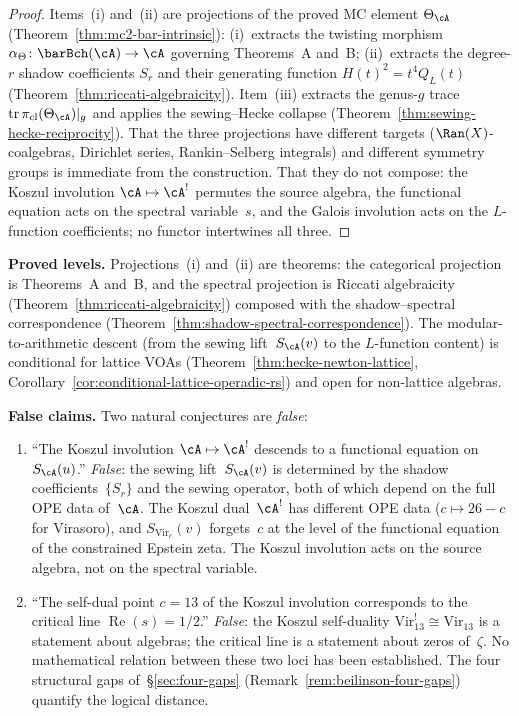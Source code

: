 \begin{proof}
Items~(i) and~(ii) are projections of the proved MC
element $\Theta_\cA$ (Theorem~\ref{thm:mc2-bar-intrinsic}):
(i)~extracts the twisting morphism
$\alpha_\Theta \colon \barBch(\cA) \to \cA$ governing
Theorems~A and~B; (ii)~extracts the degree-$r$ shadow
coefficients $S_r$ and their generating function
$H(t)^2 = t^4 Q_L(t)$
(Theorem~\ref{thm:riccati-algebraicity}).
Item~(iii) extracts the genus-$g$ trace
$\mathrm{tr}\,\pi_{\mathrm{cl}}(\Theta_\cA)|_g$
and applies the sewing--Hecke collapse
(Theorem~\ref{thm:sewing-hecke-reciprocity}).
That the three projections have different targets
($\Ran(X)$-coalgebras, Dirichlet series, Rankin--Selberg
integrals) and different symmetry groups is immediate
from the construction. That they do not compose: the
Koszul involution $\cA \mapsto \cA^!$ permutes the
source algebra, the functional equation acts on the
spectral variable~$s$, and the Galois involution acts
on the $L$-function coefficients; no functor
intertwines all three.
\end{proof}

\medskip\noindent
\textbf{Proved levels.}\enspace
Projections~(i) and~(ii) are theorems: the categorical
projection is Theorems~A and~B, and the spectral
projection is Riccati algebraicity
(Theorem~\ref{thm:riccati-algebraicity}) composed with
the shadow--spectral correspondence
(Theorem~\ref{thm:shadow-spectral-correspondence}).
The modular-to-arithmetic descent (from the sewing
lift~$S_\cA(v)$ to the $L$-function content) is
conditional for lattice VOAs
(Theorem~\ref{thm:hecke-newton-lattice},
Corollary~\ref{cor:conditional-lattice-operadic-rs})
and open for non-lattice algebras.

\medskip\noindent
\textbf{False claims.}\enspace
Two natural conjectures are \emph{false}:
\begin{enumerate}[label=\textup{(\alph*)}]
\item ``The Koszul involution $\cA \mapsto \cA^!$
 descends to a functional equation on~$S_\cA(u)$.''
 \emph{False}: the sewing lift~$S_\cA(v)$ is
 determined by the shadow coefficients~$\{S_r\}$
 and the sewing operator, both of which depend on
 the full OPE data of~$\cA$. The Koszul dual~$\cA^!$
 has different OPE data ($c \mapsto 26 - c$ for
 Virasoro), and $S_{\mathrm{Vir}_c}(v)$ forgets~$c$
 at the level of the functional equation of the
 constrained Epstein zeta. The Koszul involution
 acts on the source algebra, not on the spectral
 variable.

\item ``The self-dual point $c = 13$ of the Koszul
 involution corresponds to the critical line
 $\operatorname{Re}(s) = 1/2$.''
 \emph{False}: the Koszul self-duality
 $\mathrm{Vir}_{13}^! \cong \mathrm{Vir}_{13}$
 is a statement about algebras; the critical line
 is a statement about zeros of~$\zeta$. No
 mathematical relation between these two loci
 has been established. The four structural gaps
 of~\S\ref{sec:four-gaps}
 (Remark~\ref{rem:beilinson-four-gaps}) quantify
 the logical distance.
\end{enumerate}

